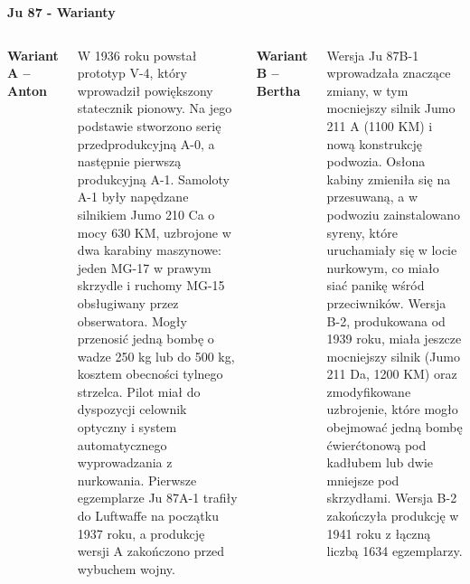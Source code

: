 \begin{frame}[t]{\Huge{\textbf{Ju 87 - Warianty}}}
	\begin{columns}[t]

{\large{\textbf{Wariant A – Anton}}	}\\~\
	\justifying

W 1936 roku powstał prototyp V-4, który wprowadził powiększony statecznik pionowy. Na jego podstawie stworzono serię przedprodukcyjną A-0, a następnie pierwszą produkcyjną A-1. Samoloty A-1 były napędzane silnikiem Jumo 210 Ca o mocy 630 KM, uzbrojone w dwa karabiny maszynowe: jeden MG-17 w prawym skrzydle i ruchomy MG-15 obsługiwany przez obserwatora. Mogły przenosić jedną bombę o wadze 250 kg lub do 500 kg, kosztem obecności tylnego strzelca. Pilot miał do dyspozycji celownik optyczny i system automatycznego wyprowadzania z nurkowania. Pierwsze egzemplarze Ju 87A-1 trafiły do Luftwaffe na początku 1937 roku, a produkcję wersji A zakończono przed wybuchem wojny.


{\large{\textbf{Wariant B – Bertha}}	}\\~\
	\justifying
	
Wersja Ju 87B-1 wprowadzała znaczące zmiany, w tym mocniejszy silnik Jumo 211 A (1100 KM) i nową konstrukcję podwozia. Osłona kabiny zmieniła się na przesuwaną, a w podwoziu zainstalowano syreny, które uruchamiały się w locie nurkowym, co miało siać panikę wśród przeciwników. Wersja B-2, produkowana od 1939 roku, miała jeszcze mocniejszy silnik (Jumo 211 Da, 1200 KM) oraz zmodyfikowane uzbrojenie, które mogło obejmować jedną bombę ćwierćtonową pod kadłubem lub dwie mniejsze pod skrzydłami. Wersja B-2 zakończyła produkcję w 1941 roku z łączną liczbą 1634 egzemplarzy. 

	\end{columns}
\end{frame}


